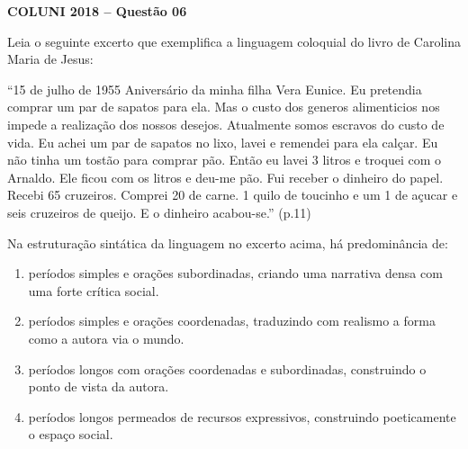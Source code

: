 \textbf{COLUNI 2018 -- Questão 06}\par\medskip Leia o seguinte excerto que exemplifica a linguagem coloquial do livro de Carolina Maria de Jesus:

\par

“15 de julho de 1955 Aniversário da minha filha Vera Eunice. Eu pretendia comprar um par de sapatos para ela. Mas o custo dos generos alimenticios nos impede a realização dos nossos desejos. Atualmente somos escravos do custo de vida. Eu achei um par de sapatos no lixo, lavei e remendei para ela calçar. Eu não tinha um tostão para comprar pão. Então eu lavei 3 litros e troquei com o Arnaldo. Ele ficou com os litros e deu-me pão. Fui receber o dinheiro do papel. Recebi 65 cruzeiros. Comprei 20 de carne. 1 quilo de toucinho e um 1 de açucar e seis cruzeiros de queijo. E o dinheiro acabou-se.” (p.11)

\par

Na estruturação sintática da linguagem no excerto acima, há predominância de:\begin{enumerate}
\item períodos simples e orações subordinadas, criando uma narrativa densa com uma forte crítica social.
\item períodos simples e orações coordenadas, traduzindo com realismo a forma como a autora via o mundo.
\item períodos longos com orações coordenadas e subordinadas, construindo o ponto de vista da autora.
\item períodos longos permeados de recursos expressivos, construindo poeticamente o espaço social.\end{enumerate}

